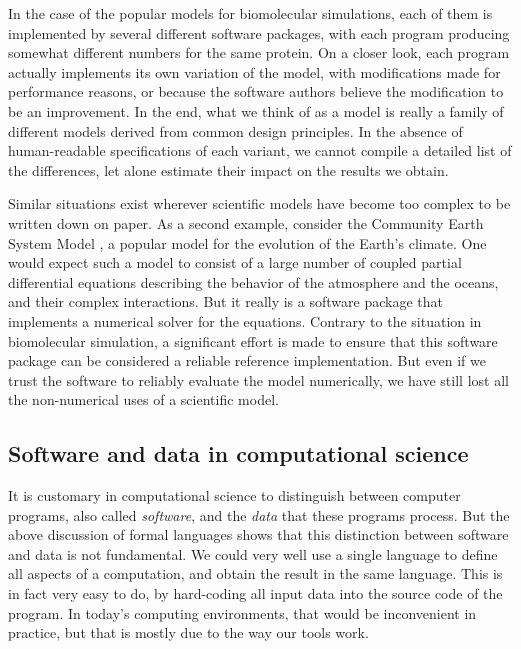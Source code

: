 In the case of the popular models for biomolecular simulations, each of them is implemented by several different software packages, with each program producing somewhat different numbers for the same protein. On a closer look, each program actually implements its own variation of the model, with modifications made for performance reasons, or because the software authors believe the modification to be an improvement. In the end, what we think of as a model is really a family of different models derived from common design principles. In the absence of human-readable specifications of each variant, we cannot compile a detailed list of the differences, let alone estimate their impact on the results we obtain.

Similar situations exist wherever scientific models have become too complex to be written down on paper. As a second example, consider the Community Earth System Model \cite{_community_1983}, a popular model for the evolution of the Earth's climate. One would expect such a model to consist of a large number of coupled partial differential equations describing the behavior of the atmosphere and the oceans, and their complex interactions. But it really is a software package that implements a numerical solver for the equations. Contrary to the situation in biomolecular simulation, a significant effort is made to ensure that this software package can be considered a reliable reference implementation. But even if we trust the software to reliably evaluate the model numerically, we have still lost all the non-numerical uses of a scientific model.

\subsection{Software and data in computational science}
\label{software-data}

It is customary in computational science to distinguish between computer programs, also called \textit{software}, and the \textit{data} that these programs process. But the above discussion of formal languages shows that this distinction between software and data is not fundamental. We could very well use a single language to define all aspects of a computation, and obtain the result in the same language. This is in fact very easy to do, by hard-coding all input data into the source code of the program. In today's computing environments, that would be inconvenient in practice, but that is mostly due to the way our tools work.

